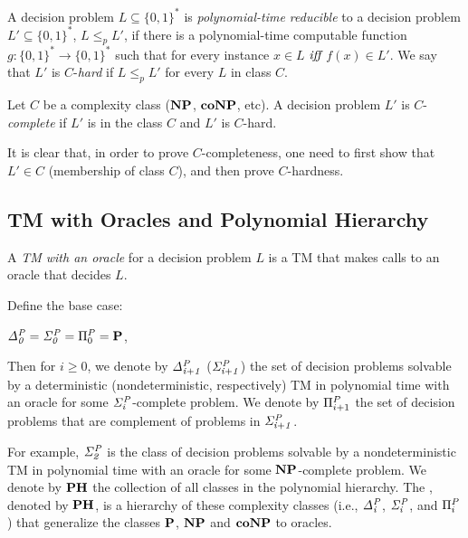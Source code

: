 \begin{definition}
	A decision problem $L \subseteq \{0,1\}^*$  is \textit{polynomial-time reducible} to
	a decision problem $L' \subseteq \{0,1\}^*$, $L \leq_p L'$, if there is a
	polynomial-time computable function $g : \{0,1\}^* \rightarrow \{0,1\}^*$
	such that for every instance $x \in L$ $\textit{iff}$ $f(x) \in L'$.
	We say that $L'$ is $C$-\textit{hard} if $L \leq_p L'$ for every $L$ in class $C$.
\end{definition}


\begin{definition}
	Let $C$ be a complexity class ($\textbf{NP}$, $\textbf{coNP}$, etc).
	A decision problem $L'$ is $C$-\textit{complete} if $L'$ is in the class 
	$C$ and $L'$ is $C$-hard.
\end{definition}
It is clear that, in order to prove $C$-completeness, one need to first show
that $L' \in C$ (membership of class $C$), and then prove $C$-hardness.



\subsection{TM with Oracles and Polynomial Hierarchy}
A \textit{TM with an oracle} for a decision problem $L$ is a TM that makes calls 
to an oracle that decides $L$.

\begin{definition}
	Define the base case:
	\begin{center}
		$\mathit{\Delta^P_{0}} = \mathit{\Sigma^P_{0}} = \Pi^P_{0} = \textbf{P}$,
	\end{center}
	Then for $i \geq 0$, we denote by $\mathit{\Delta^P_{i+1}}$ ($\mathit{\Sigma^P_{i+1}}$) 
	the set of decision problems solvable
	by a deterministic (nondeterministic, respectively) TM 
	in polynomial time with an oracle for some $\mathit{\Sigma^P_{i}}$-complete problem.
	We denote by $\Pi^P_{i+1}$ the set of decision problems that are complement
	of problems in $\mathit{\Sigma^P_{i+1}}$.
\end{definition}
For example, $\mathit{\Sigma^P_{2}}$ is the class of decision problems solvable by a nondeterministic
TM in polynomial time with an oracle for some $\textbf{NP}$-complete problem.
We denote by $\textbf{PH}$ the collection of all classes in the polynomial hierarchy.
The , denoted by $\textbf{PH}$, is a hierarchy of these
complexity classes (i.e., $\mathit{\Delta^P_{i}}$, $\mathit{\Sigma^P_{i}}$, and $\Pi^P_{i}$)
that generalize the classes $\textbf{P}$, $\textbf{NP}$ and $\textbf{coNP}$ to oracles.

